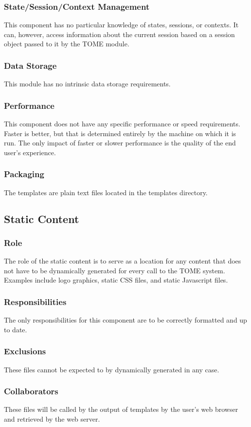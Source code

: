 \documentclass[12pt,titlepage]{article}
\begin{document}
\subsubsection{State/Session/Context Management}
This component has no particular knowledge of states, sessions, or contexts.  It can, however, access information about the current session based on a session object passed to it by the TOME module.
\subsubsection{Data Storage}
This module has no intrinsic data storage requirements.
\subsubsection{Performance}
This component does not have any specific performance or speed requirements.  Faster is better, but that is determined entirely by the machine on which it is run.  The only impact of faster or slower performance is the quality of the end user's experience.
\subsubsection{Packaging}
The templates are plain text files located in the templates directory.


\subsection{Static Content}
\subsubsection{Role}
The role of the static content is to serve as a location for any content that does not have to be dynamically generated for every call to the TOME system.  Examples include logo graphics, static CSS files, and static Javascript files.
\subsubsection{Responsibilities}
The only responsibilities for this component are to be correctly formatted and up to date.
\subsubsection{Exclusions}
These files cannot be expected to by dynamically generated in any case.
\subsubsection{Collaborators}
These files will be called by the output of templates by the user's web browser and retrieved by the web server.
\end{document}
